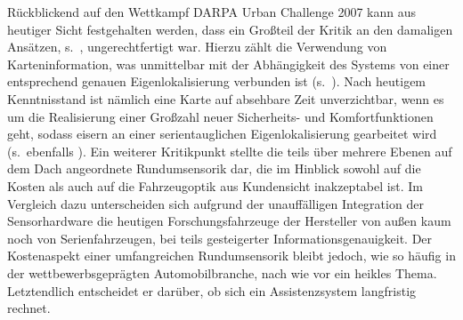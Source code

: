 Rückblickend auf den Wettkampf DARPA Urban Challenge 2007 kann aus heutiger Sicht festgehalten werden, dass ein Großteil der Kritik an den damaligen Ansätzen, s.\ \zB \cite{urmson2008adu, montemerlo2008junior, bacha2008odin, jfr2008}, ungerechtfertigt war. Hierzu zählt die Verwendung von Karteninformation, was unmittelbar mit der Abhängigkeit des Systems von einer entsprechend genauen Eigenlokalisierung verbunden ist (s.\ ). Nach heutigem Kenntnisstand ist nämlich eine Karte auf absehbare Zeit unverzichtbar, wenn es um die Realisierung einer Großzahl neuer Sicherheits- und Komfortfunktionen geht, sodass eisern an einer serientauglichen Eigenlokalisierung gearbeitet wird (s.\ ebenfalls ). Ein weiterer Kritikpunkt stellte die teils über mehrere Ebenen auf dem Dach angeordnete Rundumsensorik dar, die im Hinblick sowohl auf die Kosten als auch auf die Fahrzeugoptik aus Kundensicht inakzeptabel ist. Im Vergleich dazu unterscheiden sich aufgrund der unauffälligen Integration der Sensorhardware die heutigen Forschungsfahrzeuge der Hersteller von außen kaum noch von Serienfahrzeugen, bei teils gesteigerter Informationsgenauigkeit. Der Kostenaspekt einer umfangreichen Rundumsensorik bleibt jedoch, wie so häufig in der wettbewerbsgeprägten Automobilbranche, nach wie vor ein heikles Thema. Letztendlich entscheidet er darüber, ob sich ein Assistenzsystem langfristig rechnet.





